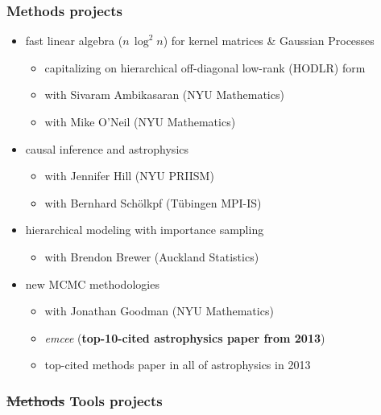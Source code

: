 \documentclass[aspectratio=169]{beamer}
\renewcommand{\emph}[1]{\textbf{#1}}
\newcommand{\project}[1]{\textsl{#1}}
\begin{document}
\begin{frame}
  \frametitle<1>{Methods projects}
  \begin{itemize}
  \item fast linear algebra ($n\,\log^2n$) for kernel matrices \& Gaussian Processes
    \begin{itemize}
    \item capitalizing on hierarchical off-diagonal low-rank (HODLR) form
    \item with Sivaram Ambikasaran (NYU Mathematics)
    \item with Mike O'Neil (NYU Mathematics)
    \end{itemize}
  \item causal inference and astrophysics
    \begin{itemize}
    \item with Jennifer Hill (NYU PRIISM)
    \item with Bernhard Sch\"olkpf (T\"ubingen MPI-IS)
    \end{itemize}
  \item hierarchical modeling with importance sampling
    \begin{itemize}
    \item with Brendon Brewer (Auckland Statistics)
    \end{itemize}
  \item new MCMC methodologies
    \begin{itemize}
    \item with Jonathan Goodman (NYU Mathematics)
    \item \project{emcee} (\emph{top-10-cited astrophysics paper from 2013})
    \item top-cited methods paper in all of astrophysics in 2013
    \end{itemize}
  \end{itemize}
  \frametitle<2>{\sout{Methods} Tools projects}
\end{frame}
\end{document}
